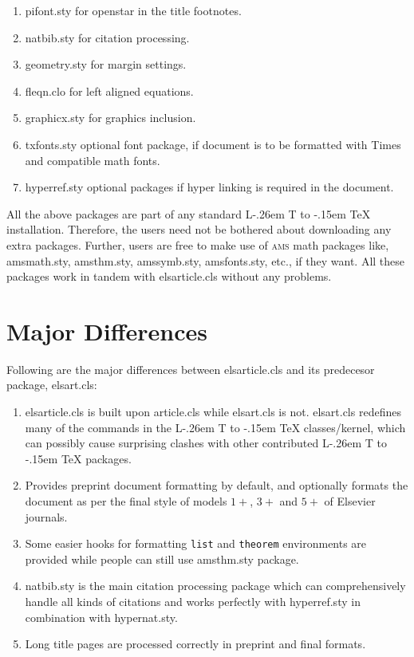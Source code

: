 \documentclass[a4paper,12pt]{article}
\makeatletter
\def\file#1{\textsf{#1}\xspace}
\DeclareRobustCommand{\LaTeX}{L\kern-.26em%
        {\sbox\z@ T%
         \vbox to\ht\z@{\hbox{\check@mathfonts
           \fontsize\sf@size\z@
           \math@fontsfalse\selectfont
          A\,}%
         \vss}%
        }%
     \kern-.15em%
    \TeX}
\makeatother
\begin{document}
\begin{enumerate}[1.]

\item \file{pifont.sty} for openstar in the title footnotes.
\item \file{natbib.sty} for citation processing.
\item \file{geometry.sty} for margin settings.
\item \file{fleqn.clo} for left aligned equations.
\item \file{graphicx.sty} for graphics inclusion.
\item \file{txfonts.sty} optional font package, if document is to
  be formatted with Times and compatible math fonts.
\item \file{hyperref.sty} optional packages if hyper linking is
  required in the document.

\end{enumerate}

All the above packages are part of any standard \LaTeX{} installation.
Therefore, the users need not be bothered about downloading any
extra packages.  Further, users are free to make use of \textsc{ams}
math packages like, \file{amsmath.sty}, \file{amsthm.sty},
\file{amssymb.sty}, \file{amsfonts.sty}, etc., if they want.  All
these packages work in tandem with \file{elsarticle.cls} without
any problems.

\section{Major Differences}
\hypertarget{majordifferences}{}

Following are the major differences between \file{elsarticle.cls}
and its predecesor package, \file{elsart.cls}:

\begin{enumerate}[\textbullet]

\item \file{elsarticle.cls} is built upon \file{article.cls}
while \file{elsart.cls} is not. \file{elsart.cls} redefines
many of the commands in the \LaTeX{} classes/kernel, which can
possibly cause surprising clashes with other contributed
\LaTeX{} packages.

\item Provides preprint document formatting by default, and
optionally formats the document as per the final
style of models $1+$, $3+$ and $5+$ of Elsevier journals.

\item Some easier hooks for formatting \verb+list+ and
\verb+theorem+ environments are provided while people can still
use \file{amsthm.sty} package.

\item \file{natbib.sty} is the main citation processing package
  which can comprehensively handle all kinds of citations and
works perfectly with \file{hyperref.sty} in combination with
\file{hypernat.sty}.

\item Long title pages are processed correctly in preprint and
  final formats.

\end{enumerate}
\end{document}
